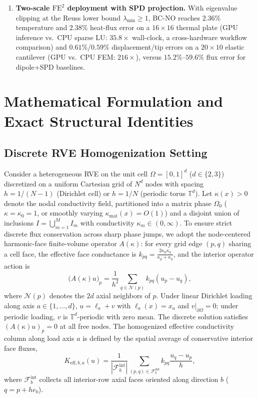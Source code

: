 \documentclass[preprint,11pt]{elsarticle}
\newcommand{\T}{\mathbb{T}}
\newcommand{\Keffij}[1]{K_{\mathrm{eff},#1}}
\newcommand{\abs}[1]{\left\lvert #1 \right\rvert}
\begin{document}
\begin{enumerate}
  \item \textbf{Two-scale $\mathrm{FE}^2$ deployment with SPD projection.} With eigenvalue clipping at the Reuss lower bound $\lambda_{\min}\ge 1$, BC-NO reaches $2.36\%$ temperature and $2.38\%$ heat-flux error on a $16\times 16$ thermal plate (GPU inference vs.\ CPU sparse LU: $35.8\times$ wall-clock, a cross-hardware workflow comparison) and $0.61\%$/$0.59\%$ displacement/tip errors on a $20\times 10$ elastic cantilever (GPU vs.\ CPU FEM: $216\times$), versus $15.2\%$--$59.6\%$ flux error for dipole+SPD baselines.
\end{enumerate}

\section{Mathematical Formulation and Exact Structural Identities}\label{sec:theory}

\subsection{Discrete RVE Homogenization Setting}

Consider a heterogeneous RVE on the unit cell $\Omega = [0, 1]^d$ ($d \in \{2, 3\}$) discretized on a uniform Cartesian grid of $N^d$ nodes with spacing $h = 1/(N-1)$ (Dirichlet cell) or $h = 1/N$ (periodic torus $\T^d$). Let $\kappa(x) > 0$ denote the nodal conductivity field, partitioned into a matrix phase $\Omega_0$ ($\kappa = \kappa_0 = 1$, or smoothly varying $\kappa_{\mathrm{mat}}(x) = O(1)$) and a disjoint union of inclusions $I = \bigcup_{m=1}^M I_m$ with conductivity $\kappa_m \in (0, \infty)$. To ensure strict discrete flux conservation across sharp phase jumps, we adopt the node-centered harmonic-face finite-volume operator $A(\kappa)$: for every grid edge $(p, q)$ sharing a cell face, the effective face conductance is $k_{pq} = \frac{2 \kappa_p \kappa_q}{\kappa_p + \kappa_q}$, and the interior operator action is
\begin{equation}\label{eq:fvm}
  \big(A(\kappa) u\big)_p = \frac{1}{h^2} \sum_{q \in \mathcal{N}(p)} k_{pq} (u_p - u_q),
\end{equation}
where $\mathcal{N}(p)$ denotes the $2d$ axial neighbors of $p$. Under linear Dirichlet loading along axis $a \in \{1,\dots,d\}$, $u = \ell_a + v$ with $\ell_a(x) = x_a$ and $v|_{\partial \Omega} = 0$; under periodic loading, $v$ is $\T^d$-periodic with zero mean. The discrete solution satisfies $(A(\kappa) u)_p = 0$ at all free nodes. The homogenized effective conductivity column along load axis $a$ is defined by the spatial average of conservative interior face fluxes,
\begin{equation}\label{eq:keff_def}
  \Keffij{b,a}(u) = \frac{1}{\abs{\mathcal{F}_b^{\mathrm{int}}}} \sum_{(p,q) \in \mathcal{F}_b^{\mathrm{int}}} k_{pq} \frac{u_q - u_p}{h},
\end{equation}
where $\mathcal{F}_b^{\mathrm{int}}$ collects all interior-row axial faces oriented along direction $b$ ($q = p + h e_b$).
\end{document}
